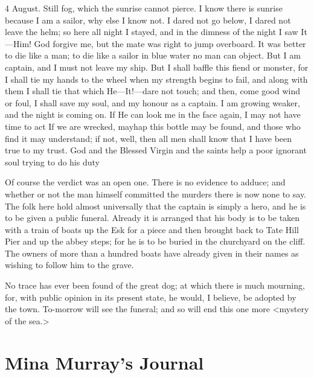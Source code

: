 \begin{diary}{4 August.}
Still fog, which the sunrise cannot pierce. I know there is sunrise because I am a sailor, why else I know not. I dared not go below, I dared not leave the helm; so here all night I stayed, and in the dimness of the night I saw It—Him! God forgive me, but the mate was right to jump overboard. It was better to die like a man; to die like a sailor in blue water no man can object. But I am captain, and I must not leave my ship. But I shall baffle this fiend or monster, for I shall tie my hands to the wheel when my strength begins to fail, and along with them I shall tie that which He—It!—dare not touch; and then, come good wind or foul, I shall save my soul, and my honour as a captain. I am growing weaker, and the night is coming on. If He can look me in the face again, I may not have time to act If we are wrecked, mayhap this bottle may be found, and those who find it may understand; if not, \textellipsis well, then all men shall know that I have been true to my trust. God and the Blessed Virgin and the saints help a poor ignorant soul trying to do his duty

 
 
Of course the verdict was an open one. There is no evidence to adduce; and whether or not the man himself committed the murders there is now none to say. The folk here hold almost universally that the captain is simply a hero, and he is to be given a public funeral. Already it is arranged that his body is to be taken with a train of boats up the Esk for a piece and then brought back to Tate Hill Pier and up the abbey steps; for he is to be buried in the churchyard on the cliff. The owners of more than a hundred boats have already given in their names as wishing to follow him to the grave.

No trace has ever been found of the great dog; at which there is much mourning, for, with public opinion in its present state, he would, I believe, be adopted by the town. To-morrow will see the funeral; and so will end this one more <mystery of the sea.>
\end{diary}

\section{Mina Murray's Journal}

